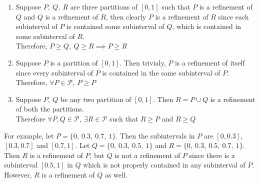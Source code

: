 \begin{remark}
\begin{enumerate}
		\begin{commentary}
		\begin{enumerate}
			\item Suppose \(P,\ Q,\ R \)  are three partitions of \( [0,1] \) such that \( P \) is a refinement of \( Q \) and \( Q \) is a refinement of \( R \), then clearly \( P \) is a refinement of \( R \) since each subinterval of \( P \) is contained some subinterval of \( Q \), which is contained in some subinterval of \( R \).\\
			Therefore, \( P \ge Q,\ Q \ge R \implies P \ge R \)
			\item Suppose \( P \) is a partition of \( [0,1] \). Then trivialy, \( P \) is a refinement of itself since every subinterval of \( P \) is contained in the same subinterval of \( P \).\\
			Therefore, \( \forall P \in \mathcal{P},\ P \ge P \)
			\item Suppose \( P,\ Q \) be any two partition of \( [0,1] \). Then \( R = P \cup Q \) is a refinement of both the partitions.\\
			Therefore \( \forall P,Q \in \mathcal{P},\ \exists R \in \mathcal{P} \) such that \( R \ge P \) and \( R \ge Q \)
		\end{enumerate}
		\end{commentary}
	\end{enumerate}
\begin{commentary}
	For example, let \( P = \{ 0,\ 0.3,\ 0.7,\ 1 \} \). Then the subintervals in \( P \) are \( [0,0.3] \), \( [0.3,0.7] \) and \( [0.7,1] \). Let \( Q = \{ 0,\ 0.3,\ 0.5,\ 1 \} \) and \( R = \{ 0,\ 0.3,\ 0.5,\ 0.7,\ 1 \} \). Then \( R \) is a refinement of \( P \), but \( Q \) is not a refinement of \( P \) since there is a subinterval \( [0.5,1] \) in \( Q \) which is not properly contained in any subinterval of \( P \). However, \( R \) is a refinement of \( Q \) as well.
\end{commentary}
\end{remark}

